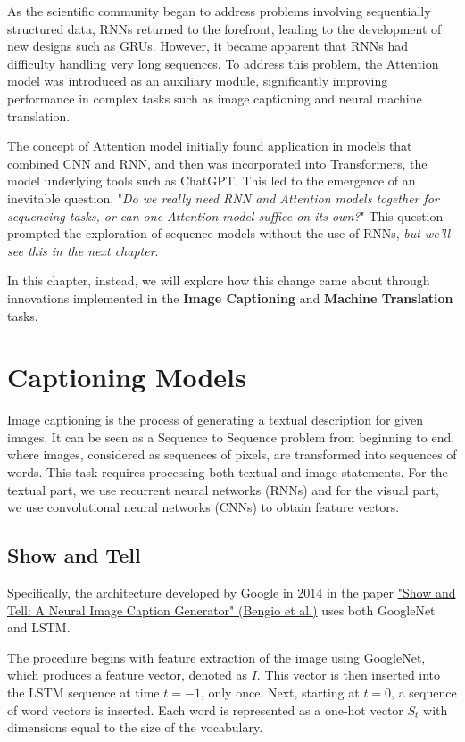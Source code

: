 As the scientific community began to address problems involving sequentially structured data, RNNs returned to the forefront, leading to the development of new designs such as GRUs. However, it became apparent that RNNs had difficulty handling very long sequences. To address this problem, the Attention model was introduced as an auxiliary module, significantly improving performance in complex tasks such as image captioning and neural machine translation. 

The concept of Attention model initially found application in models that combined CNN and RNN, and then was incorporated into Transformers, the model underlying tools such as ChatGPT. This led to the emergence of an inevitable question, "\textit{Do we really need RNN and Attention models together for sequencing tasks, or can one Attention model suffice on its own?}" This question prompted the exploration of sequence models without the use of RNNs, \textit{but we'll see this in the next chapter}.

In this chapter, instead, we will explore how this change came about through innovations implemented in the \textbf{Image Captioning} and \textbf{Machine Translation} tasks.


\section{Captioning Models}

Image captioning is the process of generating a textual description for given images. It can be seen as a Sequence to Sequence problem from beginning to end, where images, considered as sequences of pixels, are transformed into sequences of words. This task requires processing both textual and image statements. For the textual part, we use recurrent neural networks (RNNs) and for the visual part, we use convolutional neural networks (CNNs) to obtain feature vectors.

\subsection{Show and Tell}
Specifically, the architecture developed by Google in 2014 in the paper \href{https://arxiv.org/pdf/1411.4555}{"Show and Tell: A Neural Image Caption Generator" (Bengio et al.)} uses both GoogleNet and LSTM.

The procedure begins with feature extraction of the image using GoogleNet, which produces a feature vector, denoted as $I$. This vector is then inserted into the LSTM sequence at time $t=-1$, only once. Next, starting at $t=0$, a sequence of word vectors is inserted. Each word is represented as a one-hot vector $S_t$ with dimensions equal to the size of the vocabulary.

